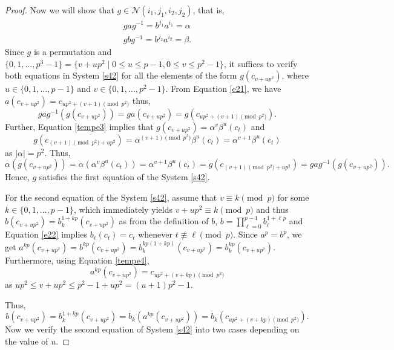 \documentclass[11pt]{amsart}
\theoremstyle{plain}
\numberwithin{equation}{section}
\begin{document}
\begin{proof}
 Now we will show that $g \in \mathcal{N}(i_1,j_1,i_2,j_2)$, that is, 
  \begin{equation}\label{s42}
  \begin{split}
  gag^{-1}=b^{j_1}a^{i_1}=\alpha \\
  gbg^{-1}=b^{j_2}a^{i_2}=\beta.
  \end{split}
  \end{equation} 
  Since $g$ is a permutation and $\{0,1,\ldots,p^3-1\}=\{v+up^2 \mid 0 \leq u \leq p-1, 0 \leq v \leq p^2-1\}$, it suffices to verify both equations in System \eqref{s42} for all the elements of the form $g(c_{v+up^2})$, where $u \in \{0,1,\ldots,p-1\}$ and $v \in \{0,1,\ldots,p^2-1\}$.  From Equation \eqref{e21}, we have $a(c_{v+up^2})=c_{up^2+(v+1) \pmod {p^2}}$ thus, 
  $$gag^{-1}(g(c_{v+up^2}))=ga(c_{v+up^2})=g(c_{up^2+(v+1) \pmod {p^2}}).$$ 
Further, Equation \eqref{tempe3} implies that $g(c_{v+up^2})=\alpha^{v}\beta^{u}(c_t)$ and $$g(c_{(v+1) \pmod {p^2}+up^2})=\alpha^{(v+1) \pmod {p^2}}\beta^{u}(c_t)=\alpha^{v+1}\beta^{u}(c_t)$$ as $|\alpha|=p^2$.
Thus,
 \[
 \alpha(g(c_{v+up^2}))= \alpha(\alpha^{v}\beta^{u}(c_t))=\alpha^{v+1}\beta^{u}(c_t)=g(c_{(v+1) \pmod {p^2}+up^2})=gag^{-1}(g(c_{v+up^2})).
 \]
 Hence, $g$ satisfies the first equation of the System \eqref{s42}. 
 
 For the second equation of the System \eqref{s42}, assume that $v \equiv k \pmod  p$ for some $k \in \{0,1,\ldots,p-1\}$, which immediately yields  $v+up^2 \equiv k \pmod  p$ and thus $b(c_{v+up^2})=b_k^{1+kp}(c_{v+up^2})$ as from the definition of $b$, $b=\displaystyle \prod_{\ell=0}^{p-1}b_{\ell}^{1+\ell p}$ and Equation \eqref{e22} implies $b_{\ell}(c_t)=c_t$ whenever $t \not \equiv \ell \pmod  p$. %
 Since $a^p=b^p$, we get $a^{kp}(c_{v+up^2})=b^{kp}(c_{v+up^2})=b_k^{kp(1+kp)}(c_{v+up^2})=b_k^{kp}(c_{v+up^2}).$  Furthermore, using Equation \eqref{tempe4}, 
 $$a^{kp}(c_{v+up^2})=c_{up^2+(v+kp)\pmod {p^2}}$$
as $up^2\leq v+up^2 \leq p^2-1+up^2 =(u+1)p^2-1$.

Thus, 
\begin{equation}\label{R43}
b(c_{v+up^2})=b_k^{1+kp}(c_{v+up^2})=b_k(a^{kp}(c_{v+up^2}))=b_k(c_{up^2+(v+kp)\pmod {p^2}}).
\end{equation}
Now we verify the second equation of System \eqref{s42} into two cases depending on the value of $u$.
 

\end{proof}
\end{document}
